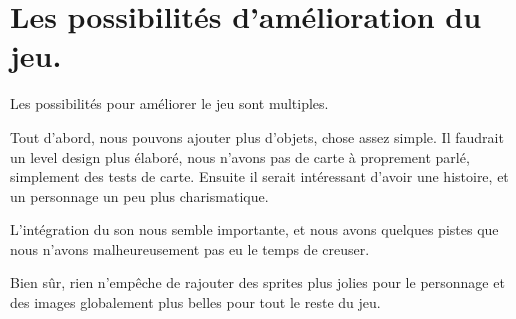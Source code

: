 \section{Les possibilités d'amélioration du jeu.}

Les possibilités pour améliorer le jeu sont multiples.

Tout d'abord, nous pouvons ajouter plus d'objets, chose assez simple.
Il faudrait un level design plus élaboré, nous n'avons pas de carte à proprement parlé, simplement des tests de carte.
Ensuite il serait intéressant d'avoir une histoire, et un personnage un peu plus charismatique.

L'intégration du son nous semble importante, et nous avons quelques pistes que nous n'avons malheureusement pas eu le temps de creuser.

Bien sûr, rien n'empêche de rajouter des sprites plus jolies pour le personnage et des images globalement plus belles pour tout le reste du jeu.

\clearpage
